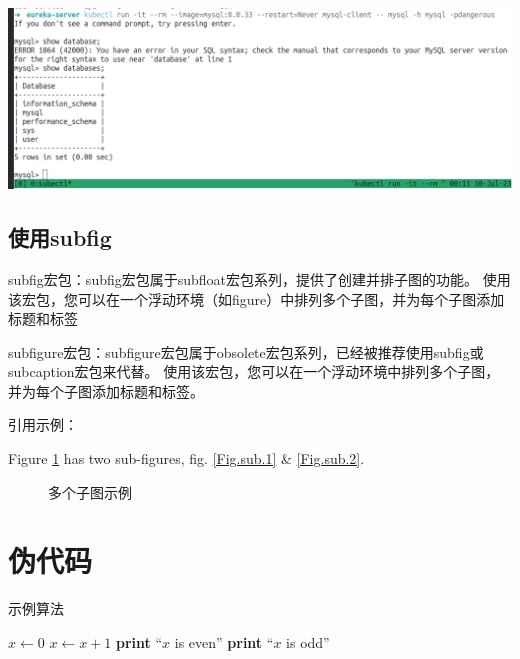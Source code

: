 \includegraphics[width=0.9\linewidth]{figures/example.png}


\subsection{使用{subfig}}

subfig宏包：subfig宏包属于subfloat宏包系列，提供了创建并排子图的功能。
使用该宏包，您可以在一个浮动环境（如figure）中排列多个子图，并为每个子图添加标题和标签


subfigure宏包：subfigure宏包属于obsolete宏包系列，已经被推荐使用subfig或subcaption宏包来代替。
使用该宏包，您可以在一个浮动环境中排列多个子图，并为每个子图添加标题和标签。

引用示例：

Figure \ref{fig:subfig-example} has two sub-figures, fig. \ref{Fig.sub.1} \& \ref{Fig.sub.2}.

\begin{figure}
    \centering
    \hfill
    \caption{多个子图示例}
    \label{fig:subfig-example}
\end{figure}

\section{伪代码}


\begin{algorithm}
    \caption{示例算法}\label{alg:example}
    \begin{algorithmic}[1]
    \State $x \gets 0$
        \State $x \gets x + 1$
            \State \textbf{print} ``$x$ is even''
        \Else
            \State \textbf{print} ``$x$ is odd''
        \EndIf
    \EndWhile
    \EndProcedure
    \end{algorithmic}
\end{algorithm}
